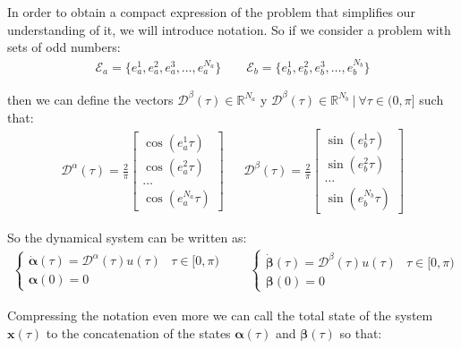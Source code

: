In order to obtain a compact expression of the problem that simplifies our understanding of it, we will introduce notation.
%
So if we consider a problem with sets of odd numbers:
\begin{gather}
    \mathcal{E}_a = \{e_a^1,e_a^2,e_a^3,\dots,e_a^{N_a}\} \hspace{2em} \mathcal{E}_b = \{e_b^1,e_b^2,e_b^3,\dots,e_b^{N_b}\}    
\end{gather}

then we can define the vectors $\bm{\mathcal{D}}^\beta(\tau) \in \mathbb{R}^{N_a} $ y $ \bm{\mathcal{D}}^\beta(\tau) \in \mathbb{R}^{N_b} \ | \ \forall \tau \in (0,\pi]$ such that:
\begin{gather}
    \bm{\mathcal{D}}^\alpha(\tau) = 
    \frac{2}{\pi}
        \begin{bmatrix} 
        \cos(e_a^1\tau) \\
        \cos(e_a^2\tau) \\
        \dots           \\
        \cos(e_a^{N_a}\tau) 
    \end{bmatrix} \ \ \text{  }  \ \ 
    \bm{\mathcal{D}}^\beta(\tau) = 
    \frac{2}{\pi}
    \begin{bmatrix} 
    \sin(e_b^1\tau) \\
    \sin(e_b^2\tau) \\
    \dots           \\
    \sin(e_b^{N_b}\tau) 
    \end{bmatrix} 
\end{gather}

So the dynamical system can be written as:
\begin{gather}
    \begin{cases}
        \dot{\bm{\alpha}}(\tau) = \bm{\mathcal{D}}^\alpha(\tau) u(\tau) & \tau \in [0,\pi)\\
        \bm{\alpha}(0) = 0
    \end{cases} \hspace{2em}
    \begin{cases}
        \dot{\bm{\beta}}(\tau)  = \bm{\mathcal{D}}^\beta(\tau) u(\tau) & \tau \in [0,\pi) \\
        \bm{\beta}(0) = 0
    \end{cases}
\end{gather}

Compressing the notation even more we can call the total state of the system $ \bm {x} (\tau) $ to the concatenation of the states $ \bm {\alpha} (\tau) $ and $ \bm {\beta} ( \tau) $ so that:

